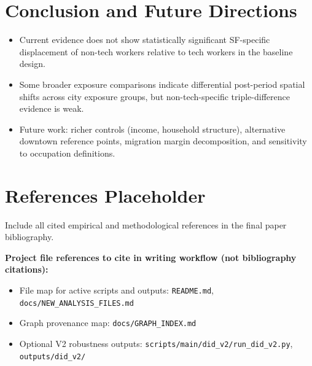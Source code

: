 \documentclass[12pt]{article}
\begin{document}
\section{Conclusion and Future Directions}
\begin{itemize}[leftmargin=*]
\item Current evidence does not show statistically significant SF-specific displacement of non-tech workers relative to tech workers in the baseline design.
\item Some broader exposure comparisons indicate differential post-period spatial shifts across city exposure groups, but non-tech-specific triple-difference evidence is weak.
\item Future work: richer controls (income, household structure), alternative downtown reference points, migration margin decomposition, and sensitivity to occupation definitions.
\end{itemize}

\section{References Placeholder}
Include all cited empirical and methodological references in the final paper bibliography.

\textbf{Project file references to cite in writing workflow (not bibliography citations):}
\begin{itemize}[leftmargin=*]
\item File map for active scripts and outputs: \texttt{README.md}, \texttt{docs/NEW\_ANALYSIS\_FILES.md}
\item Graph provenance map: \texttt{docs/GRAPH\_INDEX.md}
\item Optional V2 robustness outputs: \texttt{scripts/main/did\_v2/run\_did\_v2.py}, \texttt{outputs/did\_v2/}
\end{itemize}
\end{document}
